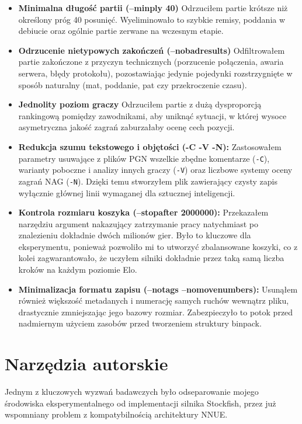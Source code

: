 \documentclass[12pt,a4paper]{report}
\begin{document}
\begin{itemize}
    \item \textbf{Minimalna długość partii (--minply 40)} Odrzuciłem partie krótsze niż określony próg 40 posunięć. Wyeliminowało to szybkie remisy, poddania w debiucie oraz ogólnie partie zerwane na wczesnym etapie.
    \item \textbf{Odrzucenie nietypowych zakończeń (--nobadresults)} Odfiltrowałem partie zakończone z przyczyn technicznych (porzucenie połączenia, awaria serwera, błędy protokołu), pozostawiając jedynie pojedynki rozstrzygnięte w sposób naturalny (mat, poddanie, pat czy przekroczenie czasu).
    \item \textbf{Jednolity poziom graczy} Odrzuciłem partie z dużą dysproporcją rankingową pomiędzy zawodnikami, aby uniknąć sytuacji, w której wysoce asymetryczna jakość zagrań zaburzałaby ocenę cech pozycji.
    \item \textbf{Redukcja szumu tekstowego i objętości (-C -V -N):} Zastosowałem parametry usuwające z plików PGN wszelkie zbędne komentarze (\texttt{-C}), warianty poboczne i analizy innych graczy (\texttt{-V}) oraz liczbowe systemy oceny zagrań NAG (\texttt{-N}). Dzięki temu stworzyłem plik zawierający czysty zapis wyłącznie głównej linii wymaganej dla sztucznej inteligencji.
    \item \textbf{Kontrola rozmiaru koszyka (--stopafter 2000000):} Przekazałem narzędziu argument nakazujący zatrzymanie pracy natychmiast po znalezieniu dokładnie dwóch milionów gier. Było to kluczowe dla eksperymentu, ponieważ pozwoliło mi to utworzyć zbalansowane koszyki, co z kolei zagwarantowało, że uczyłem silniki dokładnie przez taką samą liczba kroków na każdym poziomie Elo.
    \item \textbf{Minimalizacja formatu zapisu (--notags --nomovenumbers):} Usunąłem również większość metadanych i numerację samych ruchów wewnątrz pliku, drastycznie zmniejszając jego bazowy rozmiar. Zabezpieczyło to potok przed nadmiernym użyciem zasobów przed tworzeniem struktury binpack.
\end{itemize}

\section{Narzędzia autorskie}

Jednym z kluczowych wyzwań badawczych było odseparowanie mojego środowiska eksperymentalnego od implementacji silnika Stockfish, przez już wspomniany problem z kompatybilnością architektury NNUE.
\end{document}
